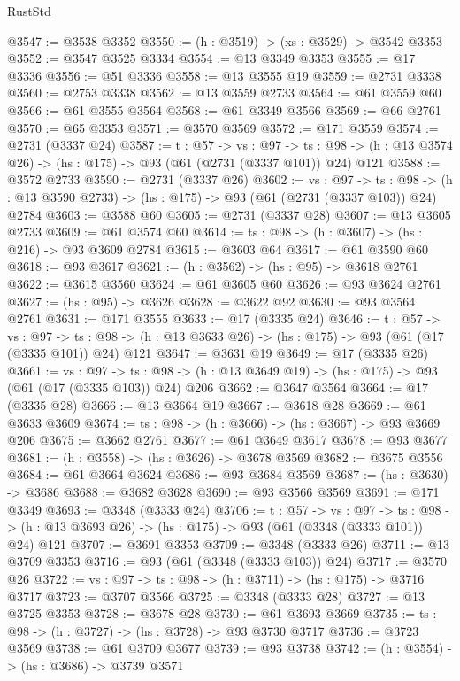 \begin{lexlean}{RustStd}
\begin{coremodule}
@3547 := @3538 @3352
@3550 := (h : @3519) -> (xs : @3529) -> @3542 @3353
@3552 := @3547 @3525 @3334
@3554 := @13 @3349 @3353
@3555 := @17 @3336
@3556 := @51 @3336
@3558 := @13 @3555 @19
@3559 := @2731 @3338
@3560 := @2753 @3338
@3562 := @13 @3559 @2733
@3564 := @61 @3559 @60
@3566 := @61 @3555 @3564
@3568 := @61 @3349 @3566
@3569 := @66 @2761
@3570 := @65 @3353
@3571 := @3570 @3569
@3572 := @171 @3559
@3574 := @2731 (@3337 @24)
@3587 := {t : @57} ->
  {vs : @97} ->
  {ts : @98} -> (h : @13 @3574 @26) -> (hs : @175) -> @93 (@61 (@2731 (@3337 @101)) @24) @121
@3588 := @3572 @2733
@3590 := @2731 (@3337 @26)
@3602 := {vs : @97} ->
  {ts : @98} -> (h : @13 @3590 @2733) -> (hs : @175) -> @93 (@61 (@2731 (@3337 @103)) @24) @2784
@3603 := @3588 @60
@3605 := @2731 (@3337 @28)
@3607 := @13 @3605 @2733
@3609 := @61 @3574 @60
@3614 := {ts : @98} -> (h : @3607) -> (hs : @216) -> @93 @3609 @2784
@3615 := @3603 @64
@3617 := @61 @3590 @60
@3618 := @93 @3617
@3621 := (h : @3562) -> (hs : @95) -> @3618 @2761
@3622 := @3615 @3560
@3624 := @61 @3605 @60
@3626 := @93 @3624 @2761
@3627 := (hs : @95) -> @3626
@3628 := @3622 @92
@3630 := @93 @3564 @2761
@3631 := @171 @3555
@3633 := @17 (@3335 @24)
@3646 := {t : @57} ->
  {vs : @97} ->
  {ts : @98} -> (h : @13 @3633 @26) -> (hs : @175) -> @93 (@61 (@17 (@3335 @101)) @24) @121
@3647 := @3631 @19
@3649 := @17 (@3335 @26)
@3661 := {vs : @97} ->
  {ts : @98} -> (h : @13 @3649 @19) -> (hs : @175) -> @93 (@61 (@17 (@3335 @103)) @24) @206
@3662 := @3647 @3564
@3664 := @17 (@3335 @28)
@3666 := @13 @3664 @19
@3667 := @3618 @28
@3669 := @61 @3633 @3609
@3674 := {ts : @98} -> (h : @3666) -> (hs : @3667) -> @93 @3669 @206
@3675 := @3662 @2761
@3677 := @61 @3649 @3617
@3678 := @93 @3677
@3681 := (h : @3558) -> (hs : @3626) -> @3678 @3569
@3682 := @3675 @3556
@3684 := @61 @3664 @3624
@3686 := @93 @3684 @3569
@3687 := (hs : @3630) -> @3686
@3688 := @3682 @3628
@3690 := @93 @3566 @3569
@3691 := @171 @3349
@3693 := @3348 (@3333 @24)
@3706 := {t : @57} ->
  {vs : @97} ->
  {ts : @98} -> (h : @13 @3693 @26) -> (hs : @175) -> @93 (@61 (@3348 (@3333 @101)) @24) @121
@3707 := @3691 @3353
@3709 := @3348 (@3333 @26)
@3711 := @13 @3709 @3353
@3716 := @93 (@61 (@3348 (@3333 @103)) @24)
@3717 := @3570 @26
@3722 := {vs : @97} -> {ts : @98} -> (h : @3711) -> (hs : @175) -> @3716 @3717
@3723 := @3707 @3566
@3725 := @3348 (@3333 @28)
@3727 := @13 @3725 @3353
@3728 := @3678 @28
@3730 := @61 @3693 @3669
@3735 := {ts : @98} -> (h : @3727) -> (hs : @3728) -> @93 @3730 @3717
@3736 := @3723 @3569
@3738 := @61 @3709 @3677
@3739 := @93 @3738
@3742 := (h : @3554) -> (hs : @3686) -> @3739 @3571

\end{coremodule}
\end{lexlean}
